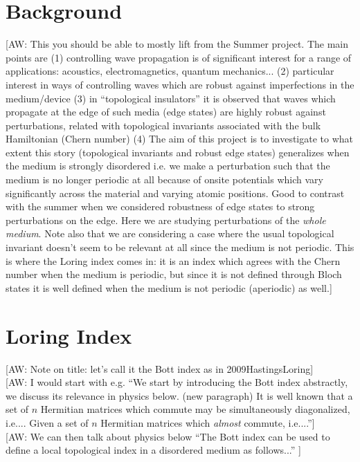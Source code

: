 \documentclass[a4paper]{article}
\newcommand{\aw}[1]{{\color{blue} [AW: #1]}}
\begin{document}
\section{Background}
\aw{This you should be able to mostly lift from the Summer project. The main points are (1) controlling wave propagation is of significant interest for a range of applications: acoustics, electromagnetics, quantum mechanics... (2) particular interest in ways of controlling waves which are robust against imperfections in the medium/device (3) in ``topological insulators'' it is observed that waves which propagate at the edge of such media (edge states) are highly robust against perturbations, related with topological invariants associated with the bulk Hamiltonian (Chern number) (4) The aim of this project is to investigate to what extent this story (topological invariants and robust edge states) generalizes when the medium is strongly disordered i.e. we make a perturbation such that the medium is no longer periodic at all because of onsite potentials which vary significantly across the material and varying atomic positions. Good to contrast with the summer when we considered robustness of edge states to strong perturbations on the edge. Here we are studying perturbations of the \emph{whole medium}. Note also that we are considering a case where the usual topological invariant doesn't seem to be relevant at all since the medium is not periodic. This is where the Loring index comes in: it is an index which agrees with the Chern number when the medium is periodic, but since it is not defined through Bloch states it is well defined when the medium is not periodic (aperiodic) as well.}
\section{Loring Index} \aw{Note on title: let's call it the Bott index as in 2009HastingsLoring} \\

\aw{I would start with e.g. ``We start by introducing the Bott index abstractly, we discuss its relevance in physics below. (new paragraph) It is well known that a set of $n$ Hermitian matrices which commute may be simultaneously diagonalized, i.e.... Given a set of $n$ Hermitian matrices which \emph{almost} commute, i.e....''} \\

\aw{We can then talk about physics below ``The Bott index can be used to define a local topological index in a disordered medium as follows...'' } \\
\end{document}
